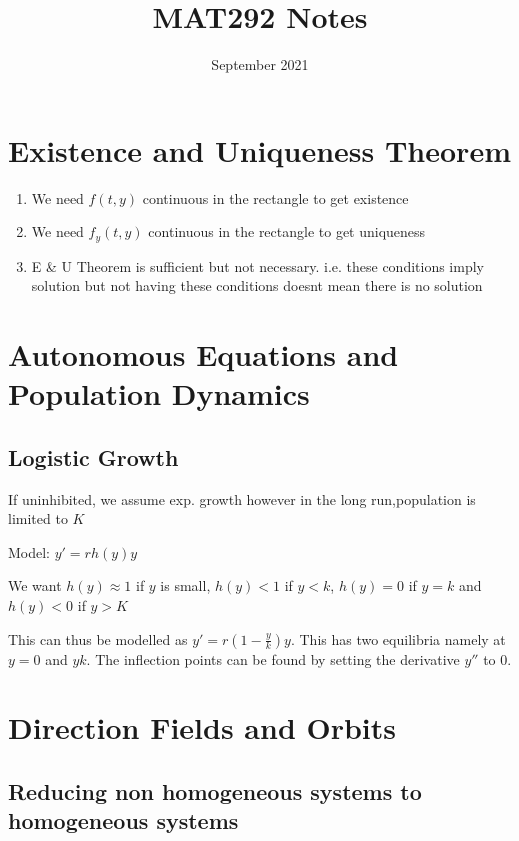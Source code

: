 \documentclass[12pt]{article}
\title{MAT292 Notes}
\date{September 2021}
\begin{document}
\maketitle
\tableofcontents

\section{Existence and Uniqueness Theorem}

\begin{enumerate}
    \item We need $f(t,y)$ continuous in the rectangle to get existence
    \item We need $f_y(t,y)$ continuous in the rectangle to get uniqueness
    \item E \& U Theorem is sufficient but not necessary. i.e. these conditions imply solution but not having these conditions doesnt mean there is no solution
\end{enumerate}

\section{Autonomous Equations and Population Dynamics}

\subsection{Logistic Growth}

If uninhibited, we assume exp. growth however in the long run,population is limited to $K$

Model: $y' = r h(y) y$

We want $h(y) \approx 1$ if $y$ is small, $h(y) < 1$ if $y < k$, $h(y) = 0 $ if $y=k$ and $h(y) < 0$ if $y>K$ 

This can thus be modelled as $y' = r(1 - \frac{y}{k})y$. This has two equilibria namely at $y=0$ and $yk$. The inflection points can be found by setting the derivative $y''$ to 0.

\section{Direction Fields and Orbits}

\subsection{Reducing non homogeneous systems to homogeneous systems}
\end{document}
